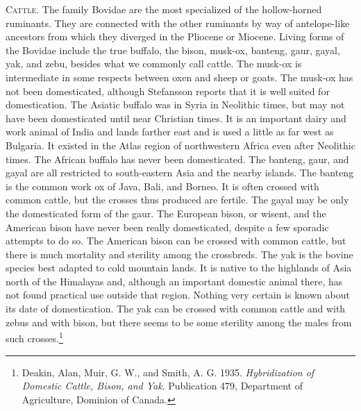 \textsc{Cattle}. The family Bovidae are the most specialized of the hollow-horned ruminants. They are connected
with the other ruminants by way of antelope-like ancestors from which they diverged in the Pliocene or Miocene.
Living forms of the Bovidae include the true buffalo, the bison, musk-ox, banteng, gaur, gayal, yak, and zebu,
besides what we commonly call cattle. The musk-ox is intermediate in some respects between oxen and sheep or
goats. The musk-ox has not been domesticated, although Stefansson reports that it is well suited for
domestication. The Asiatic buffalo was in Syria in Neolithic times, but may not have been domesticated until
near Christian times. It is an important dairy and work animal of India and lands farther east and is used a
little as far west as Bulgaria. It existed in the Atlas region of northwestern Africa even after Neolithic
times. The African buffalo has never been domesticated. The banteng, gaur, and gayal are all restricted to
south-eastern Asia and the nearby islands. The banteng is the common work ox of Java, Bali, and Borneo. It is
often crossed with common cattle, but the crosses thus produced are fertile. The gayal may be only the
domesticated form of the gaur. The European bison, or wisent, and the American bison have never been really
domesticated, despite a few sporadic attempts to do so. The American bison can be crossed with common cattle,
but there is much mortality and sterility among the crossbreds. The yak is the bovine species best adapted
to cold mountain lands. It is native to the highlands of Asia north of the Himalayas and, although an
important domestic animal there, has not found practical use outside that region. Nothing very certain is
known about its date of domestication. The yak can be crossed with common cattle and with zebus and with
bison, but there seems to be some sterility among the males from such crosses.\footnote{Deakin, Alan, Muir,
G. W., and Smith, A. G. 1935. \textit{Hybridization of Domestic Cattle, Bison, and Yak}. Publication 479,
Department of Agriculture, Dominion of Canada.}

